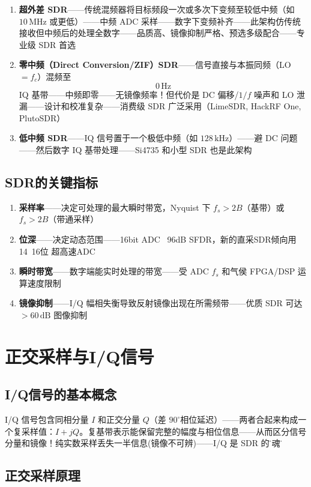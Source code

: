 \documentclass[12pt,UTF8]{ctexbook}
\begin{document}
\begin{enumerate}
\item \textbf{超外差 SDR}——传统混频器将目标频段一次或多次下变频至较低中频（如 $10\,\mathrm{MHz}$ 或更低）——中频 ADC 采样——数字下变频补齐——此架构仿传统接收但中频后的处理全数字——品质高、镜像抑制严格、预选多级配合——专业级 SDR 首选
\item \textbf{零中频（Direct Conversion/ZIF）SDR}——信号直接与本振同频（LO $= f_c$）混频至 $$0\,\mathrm{Hz}$$ IQ 基带——中频即零——无镜像频率！但代价是 DC 偏移/$1/f$ 噪声和 LO 泄漏——设计和校准复杂——消费级 SDR 广泛采用（LimeSDR, HackRF One, PlutoSDR）
\item \textbf{低中频 SDR}——IQ 信号置于一个极低中频（如 $128\,\mathrm{kHz}$）——避 DC 问题——然后数字 IQ 基带处理——Si4735 和小型 SDR 也是此架构
\end{enumerate}

\subsection{SDR的关键指标}


\begin{enumerate}
\item \textbf{采样率}——决定可处理的最大瞬时带宽，Nyquist 下 $f_s>2B$（基带）或 $f_s>2B$（带通采样）
\item \textbf{位深}——决定动态范围——16bit ADC ~96dB SFDR，新的直采SDR倾向用 14~16位 超高速ADC
\item \textbf{瞬时带宽}——数字端能实时处理的带宽——受 ADC $f_s$ 和气侯 FPGA/DSP 运算速度限制
\item \textbf{镜像抑制}——I/Q 幅相失衡导致反射镜像出现在所需频带——优质 SDR 可达 $>60\,\mathrm{dB}$ 图像抑制
\end{enumerate}

\section{正交采样与I/Q信号}
\label{sec:iq_sampling}

\subsection{I/Q信号的基本概念}

I/Q 信号包含同相分量 $I$ 和正交分量 $Q$（差 $90^\circ$相位延迟）——两者合起来构成一个复采样值：$I + jQ$。复基带表示能保留完整的幅度与相位信息——从而区分信号分量和镜像！纯实数采样丢失一半信息(镜像不可辨)——I/Q 是 SDR 的\"灵魂\"。

\subsection{正交采样原理}
\end{document}
